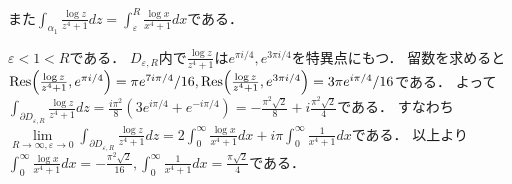 \documentclass[
		book,
		head_space=20mm,
		foot_space=20mm,
		gutter=10mm,
		line_length=190mm
]{jlreq}
\begin{document}
また$\int_{\alpha_1} \frac{\log z}{z^4+1}dz = \int_{\varepsilon}^R \frac{\log x}{x^4+1}dx$である．

$\varepsilon<1<R$である．
$D_{\varepsilon,R}$内で$\frac{\log z}{z^4+1}$は$e^{\pi i/4},e^{3\pi i/4}$を特異点にもつ．
留数を求めると$\Res(\frac{\log z}{z^4+1},e^{\pi i/4})=\pi e^{7i\pi/4}/16,\Res(\frac{\log z}{z^4+1},e^{3\pi i/4})=3\pi  e^{i\pi /4}/16$である．
よって
$\int_{\partial D_{\varepsilon,R}} \frac{\log z}{z^4+1}dz = \frac{i\pi^2}{8}(3e^{i\pi/4}+e^{-i\pi/4})=-\frac{\pi^2\sqrt{2}}{8}+i\frac{\pi^2\sqrt{2}}{4}$である．
すなわち$\lim\limits_{R\rightarrow\infty,\varepsilon\rightarrow0}\int_{\partial D_{\varepsilon,R}} \frac{\log z}{z^4+1}dz=2 \int_0^\infty \frac{\log x}{x^4+1}dx + i\pi  \int_0^\infty \frac{1}{x^4+1}dx$である．
以上より$\int_0^\infty \frac{\log x}{x^4+1}dx = -\frac{\pi^2\sqrt{2}}{16},\int_0^\infty \frac{1}{x^4+1}dx = \frac{\pi\sqrt{2}}{4}$である．
\end{document}
